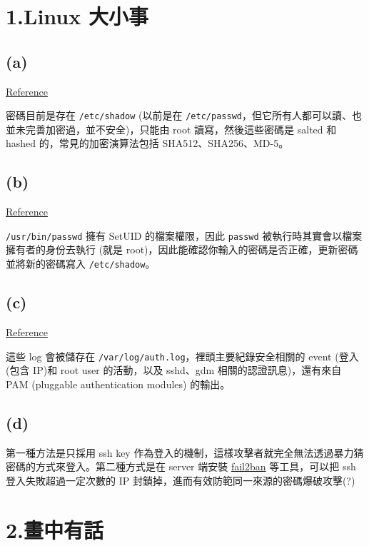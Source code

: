 \documentclass[12pt]{article}
\title{\mytitle}
\author{\textbf{\myauthor}}
\date{\today}
\begin{document}
\onehalfspacing
\maketitle

\section*{1.Linux 大小事}
\subsection*{(a)}
\href{https://security.stackexchange.com/questions/37050/where-is-my-password-stored-on-linux}{Reference}

密碼目前是存在 \verb|/etc/shadow| (以前是在 \verb|/etc/passwd|，但它所有人都可以讀、也並未完善加密過，並不安全)，只能由 root 讀寫，然後這些密碼是 salted 和 hashed 的，常見的加密演算法包括 SHA512、SHA256、MD-5。
\subsection*{(b)}
\href{https://stackoverflow.com/questions/71839786/in-the-case-of-a-normal-user-with-no-access-to-etc-shadow-file-how-can-the-pass}{Reference}

\verb|/usr/bin/passwd| 擁有 SetUID 的檔案權限，因此 \verb|passwd| 被執行時其實會以檔案擁有者的身份去執行 (就是 root)，因此能確認你輸入的密碼是否正確，更新密碼並將新的密碼寫入 \verb|/etc/shadow|。
\subsection*{(c)}
\href{https://www.loggly.com/ultimate-guide/linux-logging-basics/#:~:text=%2Fvar%2Flog%2Fauth.,pluggable%20authentication%20modules%20(PAM).}{Reference}

這些 log 會被儲存在 \verb|/var/log/auth.log|，裡頭主要紀錄安全相關的 event (登入(包含 IP)和 root user 的活動，以及 sshd、gdm 相關的認證訊息)，還有來自 PAM (pluggable authentication modules) 的輸出。
\subsection*{(d)}
第一種方法是只採用 ssh key 作為登入的機制，這樣攻擊者就完全無法透過暴力猜密碼的方式來登入。第二種方式是在 server 端安裝 \href{https://github.com/fail2ban/fail2ban}{fail2ban} 等工具，可以把 ssh 登入失敗超過一定次數的 IP 封鎖掉，進而有效防範同一來源的密碼爆破攻擊(?)

\section*{2.畫中有話}
\end{document}

